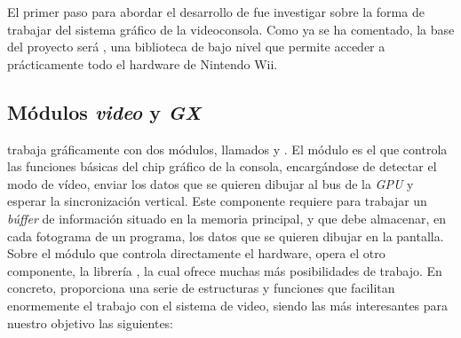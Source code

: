 



El primer paso para abordar el desarrollo de  fue investigar sobre la forma de trabajar del sistema gráfico de la videoconsola. Como ya se ha comentado, la base del proyecto será  \cite{website:libogc}, una biblioteca de bajo nivel que permite acceder a prácticamente todo el hardware de Nintendo Wii.

\subsection{Módulos \emph{video} y \emph{GX}}

 trabaja gráficamente con dos módulos, llamados  y . El módulo  es el que controla las funciones básicas del chip gráfico de la consola, encargándose de detectar el modo de vídeo, enviar los datos que se quieren dibujar al bus de la \emph{GPU} y esperar la sincronización vertical. Este componente requiere para trabajar un \emph{búffer} de información situado en la memoria principal, y que debe almacenar, en cada fotograma de un programa, los datos que se quieren dibujar en la pantalla.\\

Sobre el módulo  que controla directamente el hardware, opera el otro componente, la librería , la cual ofrece muchas más posibilidades de trabajo. En concreto, proporciona una serie de estructuras y funciones que facilitan enormemente el trabajo con el sistema de video, siendo las más interesantes para nuestro objetivo las siguientes:

